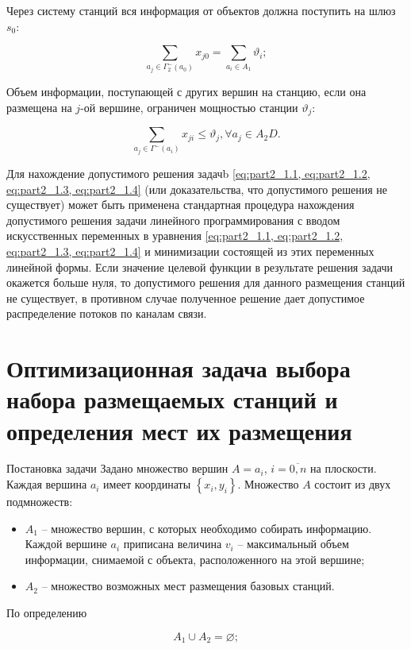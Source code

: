 Через систему станций вся информация от объектов  должна поступить  на шлюз $s_0$:

\begin{equation}\label{eq:part2_1.3}
    \sum_{a_j \in \Gamma_2^-(a_0)} x_{j0} =  \sum_{a_i \in A_1} \vartheta_i;
\end{equation}

Объем информации, поступающей с других вершин на станцию, если она размещена на $j$-ой вершине, ограничен мощностью станции $\vartheta_j$:

\begin{equation}\label{eq:part2_1.4}
    \sum_{a_j \in \Gamma^-(a_i)} x_{ji} \leqslant \vartheta_j, \forall a_j \in A_2D.
\end{equation}

Для нахождение допустимого решения задачb \cref{eq:part2_1.1, eq:part2_1.2, eq:part2_1.3, eq:part2_1.4} (или доказательства, что допустимого решения не существует) может быть применена стандартная процедура нахождения допустимого решения задачи линейного программирования с вводом искусственных переменных в уравнения \cref{eq:part2_1.1, eq:part2_1.2, eq:part2_1.3, eq:part2_1.4} и минимизации состоящей из этих переменных линейной формы. Если значение целевой функции в результате решения задачи окажется больше нуля, то допустимого решения для данного размещения станций не существует, в противном случае полученное решение дает допустимое распределение потоков по каналам связи.

\section{Оптимизационная задача выбора набора размещаемых станций и определения мест их размещения}
Постановка задачи
Задано множество вершин $A = a_i$, $i=\overline{0,n}$ на плоскости. Каждая вершина $a_i$ имеет координаты $\left\{ x_i, y_i \right\}$.
Множество $A$ состоит из двух подмножеств: 
\begin{itemize}
    \item $A_1$ -- множество вершин, с которых необходимо собирать информацию. Каждой вершине $a_i$ приписана   величина $v_i$ -- максимальный объем информации, снимаемой с объекта, расположенного на этой вершине;
    \item $A_2$ -- множество возможных мест размещения базовых станций. 
\end{itemize}

По определению

$$
A_1 \cup A_2 = \varnothing;
$$

